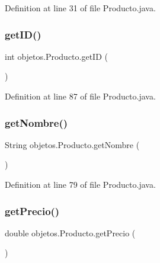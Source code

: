 Definition at line 31 of file Producto.\+java.

\mbox{\label{classobjetos_1_1_producto_a60da2dbd5b5666a42c88295cf72fc193}} 
\subsubsection{\texorpdfstring{get\+I\+D()}{getID()}}
{\footnotesize\ttfamily int objetos.\+Producto.\+get\+ID (\begin{DoxyParamCaption}{ }\end{DoxyParamCaption})}



Definition at line 87 of file Producto.\+java.

\mbox{\label{classobjetos_1_1_producto_a57f2351473e89e49d44441154f6110ed}} 
\subsubsection{\texorpdfstring{get\+Nombre()}{getNombre()}}
{\footnotesize\ttfamily String objetos.\+Producto.\+get\+Nombre (\begin{DoxyParamCaption}{ }\end{DoxyParamCaption})}



Definition at line 79 of file Producto.\+java.

\mbox{\label{classobjetos_1_1_producto_aa4b79134d6f59058f663c5e241bd6389}} 
\subsubsection{\texorpdfstring{get\+Precio()}{getPrecio()}}
{\footnotesize\ttfamily double objetos.\+Producto.\+get\+Precio (\begin{DoxyParamCaption}{ }\end{DoxyParamCaption})}




